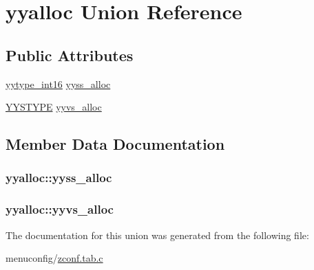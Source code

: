 \hypertarget{unionyyalloc}{\section{yyalloc Union Reference}
\label{unionyyalloc}
}
\subsection*{Public Attributes}
\begin{DoxyCompactItemize}
\item 
\hyperlink{zconf_8tab_8c_ade5b97f0021a4f6c5922ead3744ab297}{yytype\-\_\-int16} \hyperlink{unionyyalloc_a4800e0520a89a4789afa7b5d82197e65}{yyss\-\_\-alloc}
\item 
\hyperlink{unionYYSTYPE}{Y\-Y\-S\-T\-Y\-P\-E} \hyperlink{unionyyalloc_a9326f4fdc6f737a929444427836d8928}{yyvs\-\_\-alloc}
\end{DoxyCompactItemize}


\subsection{Member Data Documentation}
\hypertarget{unionyyalloc_a4800e0520a89a4789afa7b5d82197e65}{
\subsubsection[{yyss\-\_\-alloc}]{ yyalloc\-::yyss\-\_\-alloc}}\label{unionyyalloc_a4800e0520a89a4789afa7b5d82197e65}
\hypertarget{unionyyalloc_a9326f4fdc6f737a929444427836d8928}{
\subsubsection[{yyvs\-\_\-alloc}]{ yyalloc\-::yyvs\-\_\-alloc}}\label{unionyyalloc_a9326f4fdc6f737a929444427836d8928}


The documentation for this union was generated from the following file\-:\begin{DoxyCompactItemize}
\item 
menuconfig/\hyperlink{zconf_8tab_8c}{zconf.\-tab.\-c}\end{DoxyCompactItemize}
